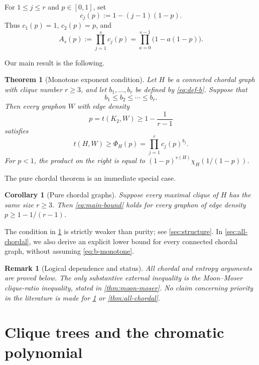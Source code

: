 \documentclass[11pt]{article}
\newtheorem{theorem}{Theorem}[section]
\newtheorem{corollary}[corollary]{Corollary}
\newtheorem{remark}[remark]{Remark}
\numberwithin{equation}{section}
\newcommand{\K}{K}
\newcommand{\PhiH}{\Phi_H}
\begin{document}
For $1\leq j\leq r$ and $p\in[0,1]$, set
\begin{equation}
 c_j(p):=1-(j-1)(1-p).\label{eq:def-c}
\end{equation}
Thus $c_1(p)=1$, $c_2(p)=p$, and
\[
 A_s(p):=\prod_{j=1}^s c_j(p)
 =\prod_{a=0}^{s-1}\bigl(1-a(1-p)\bigr).
\]

Our main result is the following.

\begin{theorem}[Monotone exponent condition]\label{thm:main}
Let $H$ be a connected chordal graph with clique number $r\geq3$, and let
$b_1,\dots,b_r$ be defined by \eqref{eq:def-b}.  Suppose that
\begin{equation}
 b_1\leq b_2\leq\cdots\leq b_r.\label{eq:b-monotone}
\end{equation}
Then every graphon $W$ with edge density
\[
 p=t(\K_2,W)\geq 1-\frac{1}{r-1}
\]
satisfies
\begin{equation}
 t(H,W)
 \geq
 \PhiH(p)
 =
 \prod_{j=1}^r c_j(p)^{b_j}.\label{eq:main-bound}
\end{equation}
For $p<1$, the product on the right is equal to
$(1-p)^{v(H)}\chi_H(1/(1-p))$.
\end{theorem}

The pure chordal theorem is an immediate special case.

\begin{corollary}[Pure chordal graphs]\label{cor:pure}
Suppose every maximal clique of $H$ has the same size $r\geq3$.  Then
\eqref{eq:main-bound} holds for every graphon of edge density
$p\geq1-1/(r-1)$.
\end{corollary}

The condition in \cref{thm:main} is strictly weaker than purity; see
\cref{sec:structure}.  In \cref{sec:all-chordal}, we also derive an
explicit lower bound for every connected chordal graph, without assuming
\eqref{eq:b-monotone}.

\begin{remark}[Logical dependence and status]\label{rem:status}
All chordal and entropy arguments are proved below.  The only substantive
external inequality is the Moon--Moser clique-ratio inequality, stated in
\cref{thm:moon-moser}.  No claim concerning priority in the literature is
made for \cref{thm:main} or \cref{thm:all-chordal}.
\end{remark}

\section{Clique trees and the chromatic polynomial}\label{sec:chordal}
\end{document}
